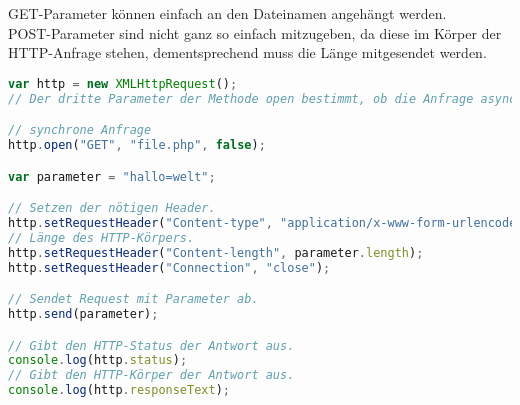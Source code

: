 GET-Parameter können einfach an den Dateinamen angehängt werden.\\
POST-Parameter sind nicht ganz so einfach mitzugeben, da diese im Körper der HTTP-Anfrage stehen, dementsprechend muss die Länge mitgesendet werden.
\begin{lstlisting}[style=custom, language=JavaScript,  caption={Synchrones AJAX mit POST-Parameter},label={lst:content_ajax_2}]
var http = new XMLHttpRequest();
// Der dritte Parameter der Methode open bestimmt, ob die Anfrage asynchron sein soll.

// synchrone Anfrage
http.open("GET", "file.php", false);

var parameter = "hallo=welt";

// Setzen der nötigen Header.
http.setRequestHeader("Content-type", "application/x-www-form-urlencoded");
// Länge des HTTP-Körpers.
http.setRequestHeader("Content-length", parameter.length);
http.setRequestHeader("Connection", "close");

// Sendet Request mit Parameter ab.
http.send(parameter);

// Gibt den HTTP-Status der Antwort aus.
console.log(http.status);
// Gibt den HTTP-Körper der Antwort aus.
console.log(http.responseText);
\end{lstlisting}
